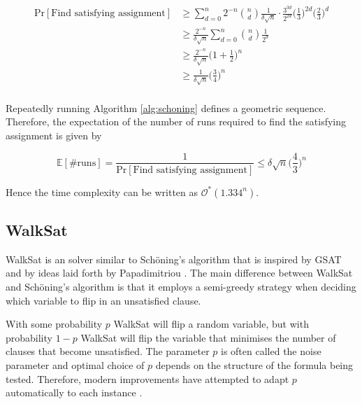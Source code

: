 \begin{align*}
    \mathrm{Pr}[\text{Find satisfying assignment}] &\geq \sum_{d=0}^{n} 2^{-n}\binom{n}{d} \frac{1}{\delta \sqrt{n}} \cdot \frac{3^{3d}}{2^{2d}} \Big( \frac{1}{3} \Big)^{2d} \Big( \frac{2}{3} \Big)^d \\[5pt]
    &\geq \frac{2^{-n}}{\delta \sqrt{n}}\sum_{d=0}^{n} \binom{n}{d}\frac{1}{2^{d}} \\[5pt]
    &\geq \frac{2^{-n}}{\delta \sqrt{n}}\Big( 1 + \frac{1}{2} \Big)^n \\[5pt]
    &\geq \frac{1}{\delta \sqrt{n}}\Big( \frac{3}{4} \Big)^n \\[5pt]
\end{align*}

Repeatedly running Algorithm \ref{alg:schoning} defines a geometric sequence.
Therefore, the expectation of the number of runs required to find the satisfying
assignment is given by

\begin{equation}
    \mathbb{E}[\text{\#runs}] = \frac{1}{\mathrm{Pr}[\text{Find satisfying assignment}]} \leq \delta\sqrt{n}\Big( \frac{4}{3} \Big)^n
\end{equation}

Hence the time complexity can be written as $\mathcal{O}^*(1.334^n)$.

\subsection{WalkSat}
WalkSat is an solver similar to Sch\"oning's algorithm that is inspired
by GSAT \cite{selman1992new, selman1994noise, selman1993local} and by ideas laid forth by Papadimitriou \cite{papadimitriou1991selecting}. The main difference between
WalkSat and Sch\"oning's algorithm is that it employs a semi-greedy
strategy when deciding which variable to flip in an unsatisfied clause.

With some probability $p$ WalkSat will flip a random variable, but
with probability $1 - p$ WalkSat will flip the variable that minimises
the number of clauses that become unsatisfied. The parameter $p$
is often called the noise parameter and optimal choice of $p$ depends
on the structure of the formula being tested. Therefore, modern improvements
have attempted to adapt $p$ automatically to each instance \cite{hoos2002adaptive}.

